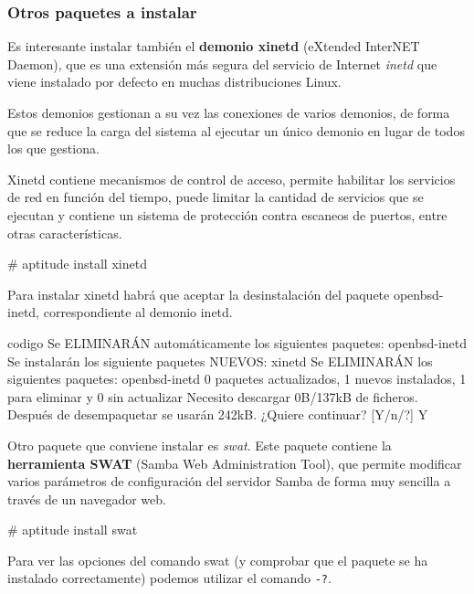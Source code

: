\subsubsection{Otros paquetes a instalar}

Es interesante instalar también el \textbf{demonio xinetd} (eXtended InterNET Daemon), que es una extensión más segura del servicio de Internet \emph{inetd} que viene instalado por defecto en muchas distribuciones Linux.

Estos demonios gestionan a su vez las conexiones de varios demonios, de forma que se reduce la carga del sistema al ejecutar un único demonio en lugar de todos los que gestiona.

Xinetd contiene mecanismos de control de acceso, permite habilitar los servicios de red en función del tiempo, puede limitar la cantidad de servicios que se ejecutan y contiene un sistema de protección contra escaneos de puertos, entre otras características.

\begin{listing}[style=consola, numbers=none]
# aptitude install xinetd
\end{listing}

Para instalar xinetd habrá que aceptar la desinstalación del paquete openbsd-inetd, correspondiente al demonio inetd.

\begin{SaveVerbatim}{codigo}
Se ELIMINARÁN automáticamente los siguientes paquetes:
  openbsd-inetd
Se instalarán los siguiente paquetes NUEVOS:
  xinetd
Se ELIMINARÁN los siguientes paquetes:
  openbsd-inetd
0 paquetes actualizados, 1 nuevos instalados, 1 para eliminar y 0 sin actualizar
Necesito descargar 0B/137kB de ficheros. Después de desempaquetar se usarán 242kB.
¿Quiere continuar? [Y/n/?] Y
\end{SaveVerbatim}

Otro paquete que conviene instalar es \emph{swat}. Este paquete contiene la \textbf{herramienta SWAT} (Samba Web Administration Tool), que permite modificar varios parámetros de configuración del servidor Samba de forma muy sencilla a través de un navegador web.

\begin{listing}[style=consola, numbers=none]
 # aptitude install swat
\end{listing}

Para ver las opciones del comando swat (y comprobar que el paquete se ha instalado correctamente) podemos utilizar el comando \texttt{-?}.

